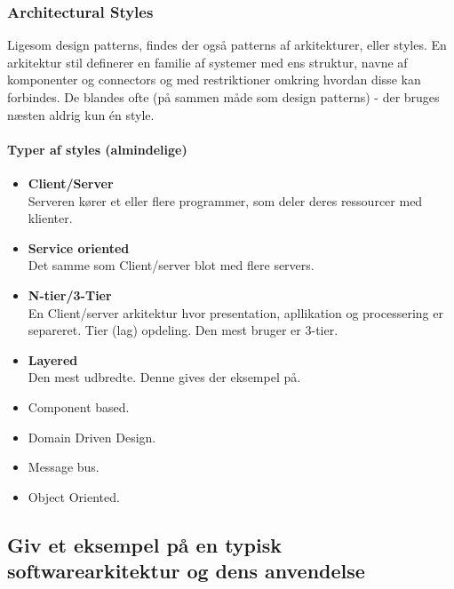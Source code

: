 \subsubsection{Architectural Styles}
Ligesom design patterns, findes der også patterns af arkitekturer, eller styles.
En arkitektur stil definerer en familie af systemer med ens struktur, navne af komponenter og connectors og med restriktioner omkring hvordan disse kan forbindes. De blandes ofte (på sammen måde som design patterns) - der bruges næsten aldrig kun én style.

\paragraph{Typer af styles (almindelige)}

\begin{itemize}
	\item \textbf{Client/Server}\\
	Serveren kører et eller flere programmer, som deler deres ressourcer med klienter.
	\item \textbf{Service oriented}\\
	Det samme som Client/server blot med flere servers.
	\item \textbf{N-tier/3-Tier}\\
	En Client/server arkitektur hvor presentation, apllikation og processering er separeret. Tier (lag) opdeling. Den mest bruger er 3-tier.
	\item \textbf{Layered}\\
	Den mest udbredte. Denne gives der eksempel på.
	\item Component based.
	\item Domain Driven Design.
	\item Message bus.
	\item Object Oriented.
\end{itemize}

\subsection{Giv et eksempel på en typisk softwarearkitektur og dens anvendelse}

